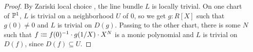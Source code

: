\begin{proof}
  By Zariski local choice \cite{draft}, the line bundle $L$ is locally trivial.
  On one chart of $\mathbb{P}^1$, $L$ is trivial on a neighborhood $U$ of $0$, so we get $g:R[X]$ such that $g(0)\neq 0$ and $L$ is trivial on $D(g)$.
  Passing to the other chart, there is some $N$ such that $f\vcentcolon\mspace{-1.2mu}\equiv f(0)^{-1}\cdot g(1/X)\cdot X^N$ is a monic polynomial and $L$ is trivial on $D(f)$,
  since $D(f)\subseteq U$.
\end{proof}


